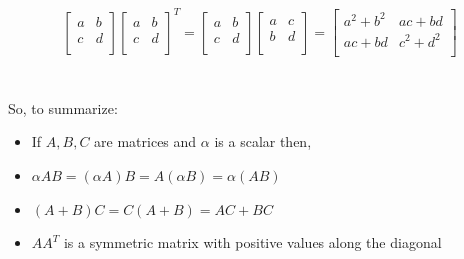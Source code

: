 \documentclass[MathsNotesBase.tex]{subfiles}
\begin{document}
{		\begin{align*}
			\begin{bmatrix}
			a & b \\
			c & d \\
			\end{bmatrix}
			\begin{bmatrix}
			a & b \\
			c & d \\
			\end{bmatrix}^{T}
			=
			\begin{bmatrix}
			a & b \\
			c & d \\
			\end{bmatrix}
			\begin{bmatrix}
			a & c \\
			b & d \\
			\end{bmatrix}
			=
			\begin{bmatrix}
			a^{2} + b^{2} & ac + bd \\
			ac + bd & c^{2} + d^{2} \\
			\end{bmatrix}		
		\end{align*}
		\\\\
		So, to summarize:
		\begin{itemize}
		\item[]{If $A,B,C$ are matrices and $\alpha$ is a scalar then,}
		\item{$\alpha AB = (\alpha A)B = A(\alpha B) = \alpha(AB)$}
		\item{$(A + B)C = C(A + B) = AC + BC$}
		\item{$AA^{T}$ is a symmetric matrix with positive values along the diagonal}
		\end{itemize}
	
		\bigskip
}
\end{document}

